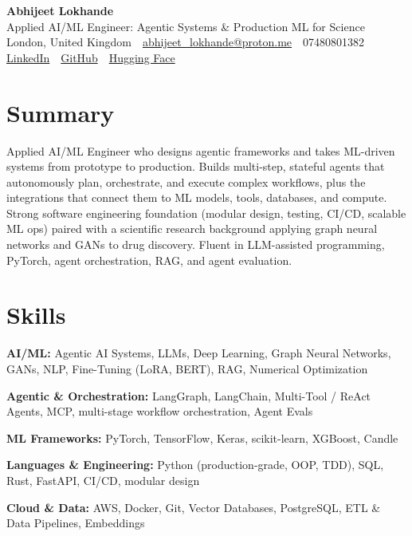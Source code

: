 \documentclass[10pt,a4paper]{article}
\newcommand{\sep}{\,\textcolor{accent!60}{\textbar}\,}
\begin{document}
\begin{center}
  {\fontsize{24}{26}\selectfont\bfseries Abhijeet Lokhande}\\[3pt]
  {\color{accent}\large Applied AI/ML Engineer: Agentic Systems \& Production ML for Science}\\[5pt]
  {\small
    London, United Kingdom \sep
    \href{mailto:abhijeet_lokhande@proton.me}{abhijeet\_lokhande@proton.me} \sep
    07480801382 \\[2pt]
    \href{https://www.linkedin.com/in/ablds/}{LinkedIn} \sep
    \href{https://github.com/abhijeetscode}{GitHub} \sep
    \href{https://huggingface.co/ab-ai}{Hugging Face}
  }
\end{center}
\vspace{2pt}

\section{Summary}
Applied AI/ML Engineer who designs agentic frameworks and takes ML-driven systems from prototype to production. Builds multi-step, stateful agents that autonomously plan, orchestrate, and execute complex workflows, plus the integrations that connect them to ML models, tools, databases, and compute. Strong software engineering foundation (modular design, testing, CI/CD, scalable ML ops) paired with a scientific research background applying graph neural networks and GANs to drug discovery. Fluent in LLM-assisted programming, PyTorch, agent orchestration, RAG, and agent evaluation.

\section{Skills}
\begin{tight}
  \item[\textcolor{accent}{\small$\bullet$}] \textbf{AI/ML:} Agentic AI Systems, LLMs, Deep Learning, Graph Neural Networks, GANs, NLP, Fine-Tuning (LoRA, BERT), RAG, Numerical Optimization
  \item[\textcolor{accent}{\small$\bullet$}] \textbf{Agentic \& Orchestration:} LangGraph, LangChain, Multi-Tool / ReAct Agents, MCP, multi-stage workflow orchestration, Agent Evals
  \item[\textcolor{accent}{\small$\bullet$}] \textbf{ML Frameworks:} PyTorch, TensorFlow, Keras, scikit-learn, XGBoost, Candle
  \item[\textcolor{accent}{\small$\bullet$}] \textbf{Languages \& Engineering:} Python (production-grade, OOP, TDD), SQL, Rust, FastAPI, CI/CD, modular design
  \item[\textcolor{accent}{\small$\bullet$}] \textbf{Cloud \& Data:} AWS, Docker, Git, Vector Databases, PostgreSQL, ETL \& Data Pipelines, Embeddings
\end{tight}
\end{document}
